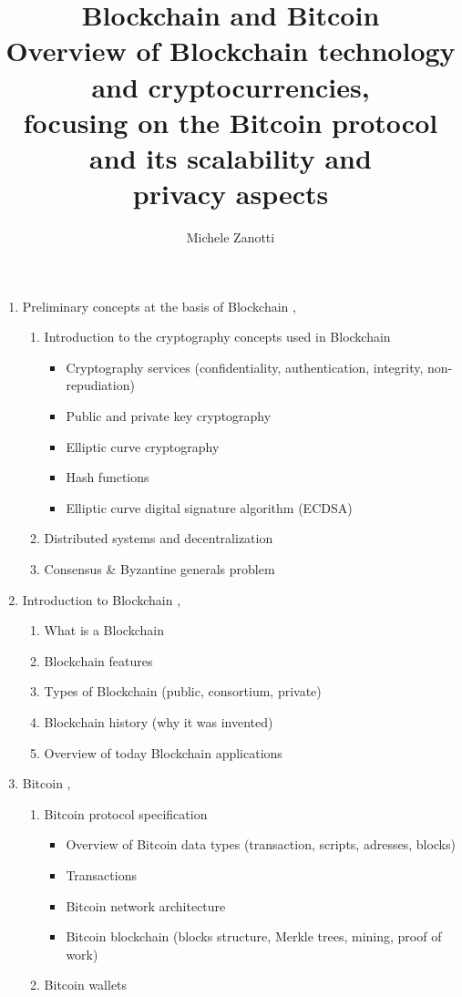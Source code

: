\documentclass[12pt, a4paper]{article}
\title{
  \textbf{Blockchain and Bitcoin} \\ 
  \large Overview of Blockchain technology and cryptocurrencies, \\
  focusing on the Bitcoin protocol and its scalability and \\ privacy aspects
}
\date{}
\author{Michele Zanotti}
\theoremstyle{definition}
\theoremstyle{remark}
\begin{document}
  \maketitle
  \tableofcontents

  \begin{enumerate}
    \item Preliminary concepts at the basis of Blockchain \cite{bambara2018blockchain},\cite{bashir2017mastering}
    \begin{enumerate}
      \item Introduction to the cryptography concepts used in Blockchain \cite{bashir2017mastering}
      \begin{itemize}
        \item Cryptography services (confidentiality, authentication, integrity, non-repudiation)
        \item Public and private key cryptography
        \item Elliptic curve cryptography
        \item Hash functions
        \item Elliptic curve digital signature algorithm (ECDSA)
      \end{itemize}
      \item Distributed systems and decentralization
      \item Consensus \& Byzantine generals problem
    \end{enumerate}

    \item Introduction to Blockchain \cite{bambara2018blockchain},\cite{bashir2017mastering}
    \begin{enumerate}
      \item What is a Blockchain
      \item Blockchain features
      \item Types of Blockchain (public, consortium, private)
      \item Blockchain history (why it was invented)
      \item Overview of today Blockchain applications
    \end{enumerate}

    \item Bitcoin \cite{karame2016bitcoin},\cite{antonopoulos2017mastering}
    \begin{enumerate}
      \item Bitcoin protocol specification
      \begin{itemize}
        \item Overview of Bitcoin data types (transaction, scripts, adresses, blocks)
        \item Transactions
        \item Bitcoin network architecture
        \item Bitcoin blockchain (blocks structure, Merkle trees, mining, proof of
        work)
      \end{itemize}
      \item Bitcoin wallets
    \end{enumerate}


\end{enumerate}
\end{document}
